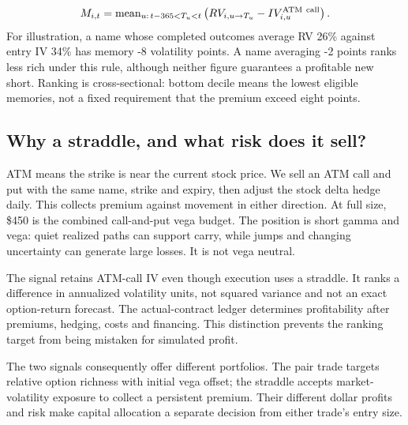 \documentclass[11pt,letterpaper]{article}
\begin{document}
\[M_{i,t}=\operatorname{mean}_{u:\,t-365<T_u<t}\left(RV_{i,u\to T_u}-IV^{\rm ATM\ call}_{i,u}\right).\]
For illustration, a name whose completed outcomes average RV 26\% against entry IV 34\% has memory -8 volatility points. A name averaging -2 points ranks less rich under this rule, although neither figure guarantees a profitable new short. Ranking is cross-sectional: bottom decile means the lowest eligible memories, not a fixed requirement that the premium exceed eight points.

\subsection*{Why a straddle, and what risk does it sell?}
ATM means the strike is near the current stock price. We sell an ATM call and put with the same name, strike and expiry, then adjust the stock delta hedge daily. This collects premium against movement in either direction. At full size, \$450 is the combined call-and-put vega budget. The position is short gamma and vega: quiet realized paths can support carry, while jumps and changing uncertainty can generate large losses. It is not vega neutral.

\begin{center}\small{}\end{center}
The signal retains ATM-call IV even though execution uses a straddle. It ranks a difference in annualized volatility units, not squared variance and not an exact option-return forecast. The actual-contract ledger determines profitability after premiums, hedging, costs and financing. This distinction prevents the ranking target from being mistaken for simulated profit.

The two signals consequently offer different portfolios. The pair trade targets relative option richness with initial vega offset; the straddle accepts market-volatility exposure to collect a persistent premium. Their different dollar profits and risk make capital allocation a separate decision from either trade's entry size.
\end{document}
